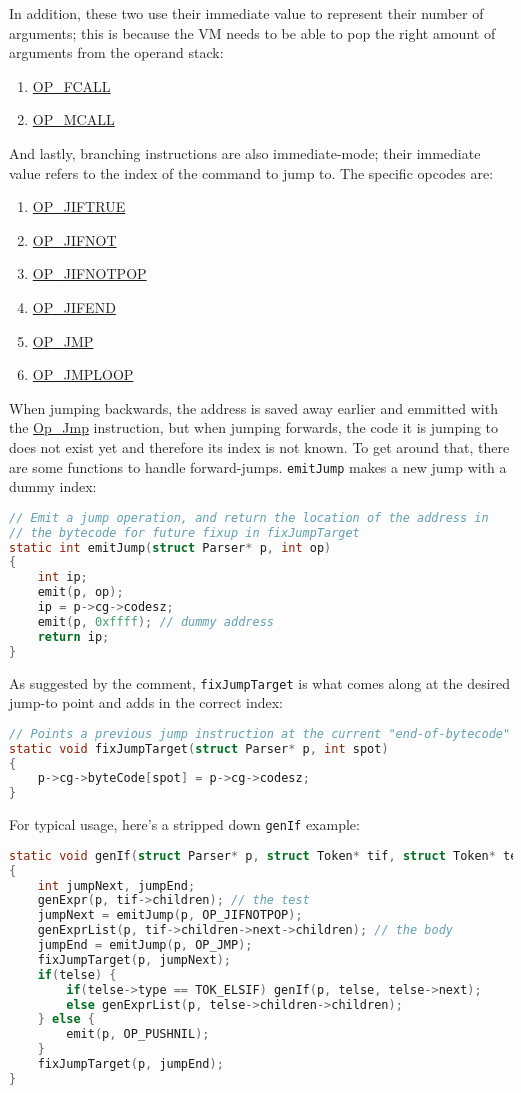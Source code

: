 \documentclass{article}
\newcommand{\func}[1]{\textcolor{func}{\tt #1}}
\newcommand{\nasalapi}[1]{\func{#1}}
\newcommand{\OP} [1]{\hyperref[op:#1]{\textcolor{opcode}{OP\_#1}}}
\newcommand{\Op} [1]{\hyperref[op:#1]{\textcolor{opcode}{\sc Op\_#1}}}
\newcommand{\br}{\penalty3}
\begin{document}
In addition, these two use their immediate value to represent their number of arguments; this is because the VM needs to be able to pop the right amount of arguments from the operand stack:
\begin{enumerate}
\item \OP{FCALL}
\item \OP{MCALL}
\end{enumerate}

And lastly, branching instructions are also immediate-mode; their immediate value refers to the index of the command to jump to.  The specific opcodes are:
\begin{enumerate}
\item \OP{JIFTRUE}
\item \OP{JIFNOT}
\item \OP{JIFNOTPOP}
\item \OP{JIFEND}
\item \OP{JMP}
\item \OP{JMPLOOP}
\end{enumerate}

When jumping backwards, the address is saved away earlier and emmitted with the \Op{Jmp} instruction, but when jumping forwards, the code it is jumping to does not exist yet and therefore its index is not known.  To get around that, there are some functions to handle forward-jumps.  \nasalapi{emit\br Jump} makes a new jump with a dummy index:

\begin{lstlisting}[language=C]
// Emit a jump operation, and return the location of the address in
// the bytecode for future fixup in fixJumpTarget
static int emitJump(struct Parser* p, int op)
{
    int ip;
    emit(p, op);
    ip = p->cg->codesz;
    emit(p, 0xffff); // dummy address
    return ip;
}
\end{lstlisting}

As suggested by the comment, \nasalapi{fix\br Jump\br Target} is what comes along at the desired jump-to point and adds in the correct index:

\begin{lstlisting}[language=C]
// Points a previous jump instruction at the current "end-of-bytecode"
static void fixJumpTarget(struct Parser* p, int spot)
{
    p->cg->byteCode[spot] = p->cg->codesz;
}
\end{lstlisting}

For typical usage, here's a stripped down \nasalapi{gen\br If} example:

\begin{lstlisting}[language=C]
static void genIf(struct Parser* p, struct Token* tif, struct Token* telse)
{
    int jumpNext, jumpEnd;
    genExpr(p, tif->children); // the test
    jumpNext = emitJump(p, OP_JIFNOTPOP);
    genExprList(p, tif->children->next->children); // the body
    jumpEnd = emitJump(p, OP_JMP);
    fixJumpTarget(p, jumpNext);
    if(telse) {
        if(telse->type == TOK_ELSIF) genIf(p, telse, telse->next);
        else genExprList(p, telse->children->children);
    } else {
        emit(p, OP_PUSHNIL);
    }
    fixJumpTarget(p, jumpEnd);
}
\end{lstlisting}
\end{document}
